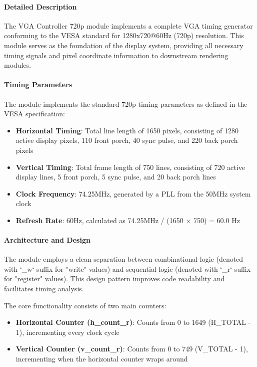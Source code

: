 \documentclass[12pt,a4paper]{article}
\begin{document}
\paragraph{Detailed Description}

The VGA Controller 720p module implements a complete VGA timing generator conforming to the VESA standard for 1280x720@60Hz (720p) resolution. This module serves as the foundation of the display system, providing all necessary timing signals and pixel coordinate information to downstream rendering modules.

\paragraph{Timing Parameters}
The module implements the standard 720p timing parameters as defined in the VESA specification:
\begin{itemize}
    \item \textbf{Horizontal Timing}: Total line length of 1650 pixels, consisting of 1280 active display pixels, 110 front porch, 40 sync pulse, and 220 back porch pixels
    \item \textbf{Vertical Timing}: Total frame length of 750 lines, consisting of 720 active display lines, 5 front porch, 5 sync pulse, and 20 back porch lines
    \item \textbf{Clock Frequency}: 74.25MHz, generated by a PLL from the 50MHz system clock
    \item \textbf{Refresh Rate}: 60Hz, calculated as 74.25MHz / (1650 × 750) = 60.0 Hz
\end{itemize}

\paragraph{Architecture and Design}
The module employs a clean separation between combinational logic (denoted with `\_w` suffix for "write" values) and sequential logic (denoted with `\_r` suffix for "register" values). This design pattern improves code readability and facilitates timing analysis.

The core functionality consists of two main counters:
\begin{itemize}
    \item \textbf{Horizontal Counter (h\_count\_r)}: Counts from 0 to 1649 (H\_TOTAL - 1), incrementing every clock cycle
    \item \textbf{Vertical Counter (v\_count\_r)}: Counts from 0 to 749 (V\_TOTAL - 1), incrementing when the horizontal counter wraps around
\end{itemize}
\end{document}
